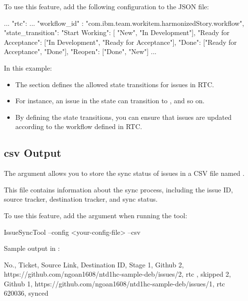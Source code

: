 To use this feature, add the following configuration to the JSON file:

\begin{pythoncode}
{
   ...
   "rtc": {
      ...
      "workflow_id" : "com.ibm.team.workitem.harmonizedStory.workflow",
      "state_transition": {
         "Start Working": [ "New", "In Development"],
         "Ready for Acceptance": ["In Development", "Ready for Acceptance"],
         "Done": ["Ready for Acceptance", "Done"],
         "Reopen": ["Done", "New"]
      }
   }
   ...
}
\end{pythoncode}

In this example:
\begin{itemize}
   \item The  section defines the allowed state
         transitions for issues in RTC.
   \item For instance, an issue in the  state can transition to
         , and so on.
   \item By defining the state transitions, you can ensure that issues are
         updated according to the workflow defined in RTC.
\end{itemize}

\subsection{csv Output}
The  argument allows you to store the sync status of issues in a
CSV file named .

This file contains information about the sync process, including the issue ID,
source tracker, destination tracker, and sync status.

To use this feature, add the  argument when running the tool:

\begin{pythonlog}
IssueSyncTool --config <your-config-file> --csv
\end{pythonlog}

Sample output in :
\begin{pythonlog}
No., Ticket, Source Link, Destination ID, Stage
1, Github 2, https://github.com/ngoan1608/ntd1hc-sample-deb/issues/2, rtc , skipped
2, Github 1, https://github.com/ngoan1608/ntd1hc-sample-deb/issues/1, rtc 620036, synced

\end{pythonlog}

